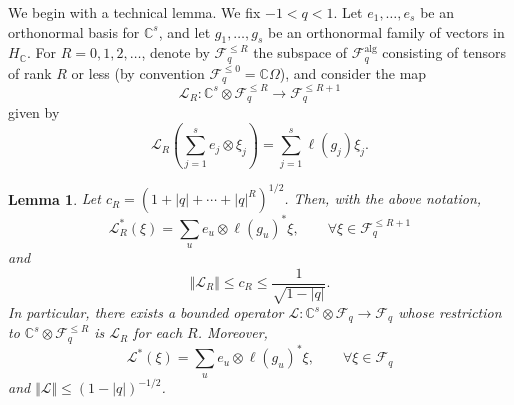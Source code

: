 \documentclass[11pt]{article}
\newtheorem{lemma}{Lemma}
\begin{document}
We begin with a technical lemma.  We fix $-1<q<1$. 
  Let $e_1,\dots,e_s$ be an orthonormal basis for $\mathbb{C}^s$, and let $g_1,\dots,g_s$ be an orthonormal family of vectors in $H_\mathbb{C}$.  For $R=0,1,2,\dots$, denote by 
    $\mathscr{F}_q^{\leq R}$ the subspace of $\mathscr{F}_q^{\operatorname{alg}}$ consisting of tensors of rank $R$ or less (by convention $\mathscr{F}_q^{\leq 0} = \mathbb{C}\Omega$), and consider the map $$\mathscr{L}_R : \mathbb{C}^s \otimes \mathscr{F}_q^{\leq R}\to\mathscr{F}_q^{\leq R+1} $$ given by
    $$\mathscr{L}_R \left(\sum_{j=1}^s e_j \otimes \xi_j \right )= \sum_{j=1}^s\ell(g_j) \xi_j.$$

\begin{lemma} \label{lem:operatorL}
   Let $c_R = (1 + |q| + \cdots + |q|^{R})^{1/2}$.   Then, with the above notation, \begin{equation}\label{eq:scriptEllStar} 
    \mathscr{L}_R^* (\xi) = \sum_u e_u \otimes \ell(g_u)^* \xi,\qquad \forall \xi\in \mathscr{F}_q^{\leq R+1}
    \end{equation} and  $$\Vert \mathscr{L}_R \Vert \leq c_R \leq \frac{1}{\sqrt{1-|q|}}.$$  In particular, there exists a bounded operator $\mathscr{L}:\mathbb{C}^s\otimes \mathscr{F}_q\to\mathscr{F}_q$ whose restriction to  $\mathbb{C}^s\otimes \mathscr{F}_q^{\leq R}$ is $\mathscr{L}_R$ for each $R$. Moreover,  
    \begin{equation}\label{eq:scriptEllStarClosure} 
    \mathscr{L}^* (\xi) = \sum_u e_u \otimes \ell(g_u)^* \xi,\qquad \forall \xi\in \mathscr{F}_q
    \end{equation} and $\Vert \mathscr{L}\Vert  \leq (1-|q|)^{-1/2}$. 
    
\end{lemma}
\end{document}
